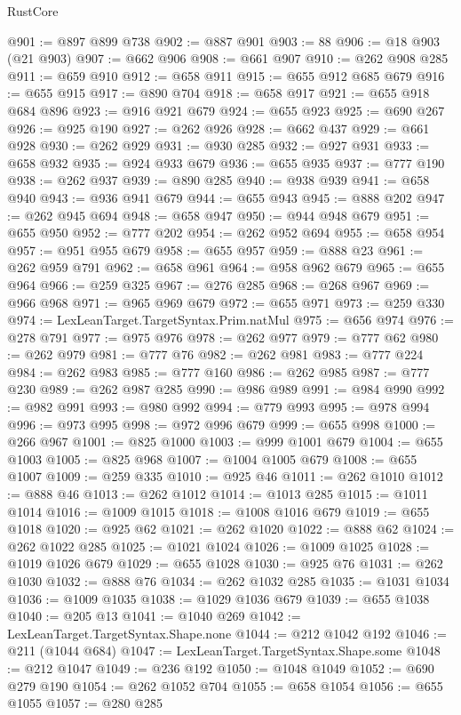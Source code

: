 \begin{lexlean}{RustCore}
\begin{coremodule}
@901 := @897 @899 @738
@902 := @887 @901
@903 := 88
@906 := @18 @903 (@21 @903)
@907 := @662 @906
@908 := @661 @907
@910 := @262 @908 @285
@911 := @659 @910
@912 := @658 @911
@915 := @655 @912 @685 @679
@916 := @655 @915
@917 := @890 @704
@918 := @658 @917
@921 := @655 @918 @684 @896
@923 := @916 @921 @679
@924 := @655 @923
@925 := @690 @267
@926 := @925 @190
@927 := @262 @926
@928 := @662 @437
@929 := @661 @928
@930 := @262 @929
@931 := @930 @285
@932 := @927 @931
@933 := @658 @932
@935 := @924 @933 @679
@936 := @655 @935
@937 := @777 @190
@938 := @262 @937
@939 := @890 @285
@940 := @938 @939
@941 := @658 @940
@943 := @936 @941 @679
@944 := @655 @943
@945 := @888 @202
@947 := @262 @945 @694
@948 := @658 @947
@950 := @944 @948 @679
@951 := @655 @950
@952 := @777 @202
@954 := @262 @952 @694
@955 := @658 @954
@957 := @951 @955 @679
@958 := @655 @957
@959 := @888 @23
@961 := @262 @959 @791
@962 := @658 @961
@964 := @958 @962 @679
@965 := @655 @964
@966 := @259 @325
@967 := @276 @285
@968 := @268 @967
@969 := @966 @968
@971 := @965 @969 @679
@972 := @655 @971
@973 := @259 @330
@974 := LexLeanTarget.TargetSyntax.Prim.natMul
@975 := @656 @974
@976 := @278 @791
@977 := @975 @976
@978 := @262 @977
@979 := @777 @62
@980 := @262 @979
@981 := @777 @76
@982 := @262 @981
@983 := @777 @224
@984 := @262 @983
@985 := @777 @160
@986 := @262 @985
@987 := @777 @230
@989 := @262 @987 @285
@990 := @986 @989
@991 := @984 @990
@992 := @982 @991
@993 := @980 @992
@994 := @779 @993
@995 := @978 @994
@996 := @973 @995
@998 := @972 @996 @679
@999 := @655 @998
@1000 := @266 @967
@1001 := @825 @1000
@1003 := @999 @1001 @679
@1004 := @655 @1003
@1005 := @825 @968
@1007 := @1004 @1005 @679
@1008 := @655 @1007
@1009 := @259 @335
@1010 := @925 @46
@1011 := @262 @1010
@1012 := @888 @46
@1013 := @262 @1012
@1014 := @1013 @285
@1015 := @1011 @1014
@1016 := @1009 @1015
@1018 := @1008 @1016 @679
@1019 := @655 @1018
@1020 := @925 @62
@1021 := @262 @1020
@1022 := @888 @62
@1024 := @262 @1022 @285
@1025 := @1021 @1024
@1026 := @1009 @1025
@1028 := @1019 @1026 @679
@1029 := @655 @1028
@1030 := @925 @76
@1031 := @262 @1030
@1032 := @888 @76
@1034 := @262 @1032 @285
@1035 := @1031 @1034
@1036 := @1009 @1035
@1038 := @1029 @1036 @679
@1039 := @655 @1038
@1040 := @205 @13
@1041 := @1040 @269
@1042 := LexLeanTarget.TargetSyntax.Shape.none
@1044 := @212 @1042 @192
@1046 := @211 (@1044 @684)
@1047 := LexLeanTarget.TargetSyntax.Shape.some
@1048 := @212 @1047
@1049 := @236 @192
@1050 := @1048 @1049
@1052 := @690 @279 @190
@1054 := @262 @1052 @704
@1055 := @658 @1054
@1056 := @655 @1055
@1057 := @280 @285

\end{coremodule}
\end{lexlean}
